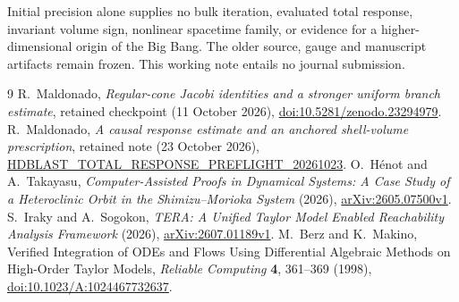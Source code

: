 \documentclass[11pt]{article}
\begin{document}
Initial precision alone supplies no bulk iteration, evaluated total response,
invariant volume sign, nonlinear spacetime family, or evidence for a
higher-dimensional origin of the Big Bang. The older source, gauge and
manuscript artifacts remain frozen. This working note entails no journal
submission.

\begin{thebibliography}{9}\small
{} R.~Maldonado, \emph{Regular-cone Jacobi identities and a stronger
uniform branch estimate}, retained checkpoint (11 October 2026),
\href{https://doi.org/10.5281/zenodo.23294979}{doi:10.5281/zenodo.23294979}.
 R.~Maldonado, \emph{A causal response estimate and an anchored
shell-volume prescription}, retained note (23 October 2026),
\href{https://github.com/maldonado-research/HDblast/tree/87b5c6edb0e5eb4033be6eb24bd631467c576ad5/research/HDBLAST_TOTAL_RESPONSE_PREFLIGHT_20261023}{HDBLAST\_TOTAL\_RESPONSE\_PREFLIGHT\_20261023}.
 O.~H\'enot and A.~Takayasu, \emph{Computer-Assisted Proofs in
Dynamical Systems: A Case Study of a Heteroclinic Orbit in the
Shimizu--Morioka System} (2026),
\href{https://arxiv.org/abs/2605.07500v1}{arXiv:2605.07500v1}.
 S.~Iraky and A.~Sogokon, \emph{TERA: A Unified Taylor Model Enabled
Reachability Analysis Framework} (2026),
\href{https://arxiv.org/abs/2607.01189v1}{arXiv:2607.01189v1}.
 M.~Berz and K.~Makino, Verified Integration of ODEs and Flows
Using Differential Algebraic Methods on High-Order Taylor Models,
\emph{Reliable Computing} \textbf{4}, 361--369 (1998),
\href{https://doi.org/10.1023/A:1024467732637}{doi:10.1023/A:1024467732637}.
\end{thebibliography}
\end{document}
